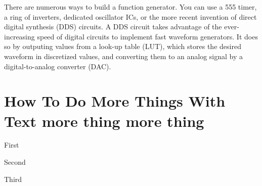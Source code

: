 \documentclass[letterpaper, 11pt]{article}
\begin{document}
There are numerous ways to build a function generator. You can use a 555 timer, a ring of inverters, dedicated oscillator ICs, or the more recent invention of direct digital synthesis (DDS) circuits. A DDS circuit takes advantage of the ever-increasing speed of digital circuits to implement fast waveform generators. It does so by outputing values from a look-up table (LUT), which stores the desired waveform in discretized values, and converting them to an analog signal by a digital-to-analog converter (DAC). 


\reversemarginpar
{}

  \kant[2]

\section{How To Do More Things With Text more thing more thing}
  \kant[2]
  \begin{steps}
    \item First
    \item Second
    \item Third
  \end{steps}
\end{document}
